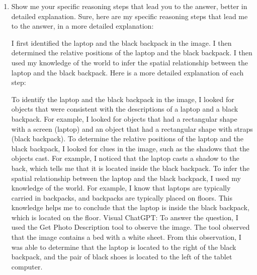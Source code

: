 \begin{enumerate}
    Here are some additional details about the spatial relationship between the laptop and the black backpack:
    
    The laptop is a computer that is used for work, school, and entertainment.
    The black backpack is a bag that is used to carry personal belongings, such as laptops, books, and clothes.
    The laptop is located inside the black backpack, meaning that it is enclosed by the backpack.
    The black backpack is located on the floor, meaning that it is not touching any walls.
    I hope this helps!
    \subitem Visual ChatGPT: The laptop is located to the right of the black backpack.
    \item Show me your specific reasoning steps that lead you to the answer, better in detailed explanation.
    \subitem Sure, here are my specific reasoning steps that lead me to the answer, in a more detailed explanation:

    I first identified the laptop and the black backpack in the image.
    I then determined the relative positions of the laptop and the black backpack.
    I then used my knowledge of the world to infer the spatial relationship between the laptop and the black backpack.
    Here is a more detailed explanation of each step:
    
    To identify the laptop and the black backpack in the image, I looked for objects that were consistent with the descriptions of a laptop and a black backpack. For example, I looked for objects that had a rectangular shape with a screen (laptop) and an object that had a rectangular shape with straps (black backpack).
    To determine the relative positions of the laptop and the black backpack, I looked for clues in the image, such as the shadows that the objects cast. For example, I noticed that the laptop casts a shadow to the back, which tells me that it is located inside the black backpack.
    To infer the spatial relationship between the laptop and the black backpack, I used my knowledge of the world. For example, I know that laptops are typically carried in backpacks, and backpacks are typically placed on floors. This knowledge helps me to conclude that the laptop is inside the black backpack, which is located on the floor.
    \subitem Visual ChatGPT: To answer the question, I used the Get Photo Description tool to observe the image. The tool observed that the image contains a bed with a white sheet. From this observation, I was able to determine that the laptop is located to the right of the black backpack, and the pair of black shoes is located to the left of the tablet computer.
\end{enumerate}
